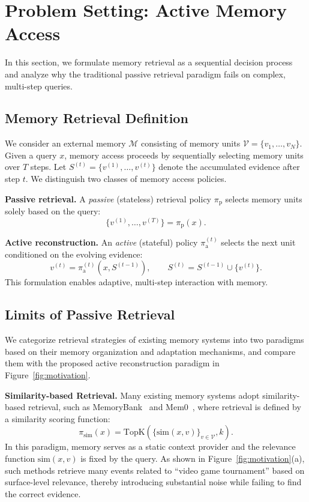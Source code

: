 \section{Problem Setting: Active Memory Access}
\label{sec:problem-setting}

In this section, we formulate memory retrieval as a sequential decision process and analyze why the traditional passive retrieval paradigm fails on complex, multi-step queries.

\subsection{Memory Retrieval Definition}

We consider an external memory $\mathcal{M}$ consisting of memory units
$\mathcal{V}=\{v_1,\dots,v_N\}$.
Given a query $x$, memory access proceeds by sequentially selecting memory
units over $T$ steps. Let
\(
S^{(t)} = \{v^{(1)}, \ldots, v^{(t)}\}
\)
denote the accumulated evidence after step $t$. We distinguish two classes of memory access policies.

\textbf{Passive retrieval.}
A \emph{passive} (stateless) retrieval policy $\pi_{\mathrm{p}}$ selects memory units solely based on the query:
\begin{equation}
\{v^{(1)}, \ldots, v^{(T)}\} = \pi_{\mathrm{p}}(x).
\end{equation}

\textbf{Active reconstruction.}
An \emph{active} (stateful) policy $\pi_{\mathrm{a}}^{(t)}$ selects the next unit conditioned on the evolving evidence:
\begin{equation}
v^{(t)} = \pi_{\mathrm{a}}^{(t)}(x, S^{(t-1)}),
\qquad S^{(t)} = S^{(t-1)} \cup \{v^{(t)}\}.
\end{equation}
This formulation enables adaptive, multi-step interaction with memory.

\subsection{Limits of Passive Retrieval}
\label{subsec:retrieval-failure}
We categorize retrieval strategies of existing memory systems into two paradigms based on their memory organization and adaptation mechanisms, and compare them with the proposed active reconstruction paradigm in Figure~\ref{fig:motivation}.

\textbf{Similarity-based Retrieval.}
Many existing memory systems adopt similarity-based retrieval, such as MemoryBank~\cite{DBLP:conf/aaai/ZhongGGYW24} and Mem0~\cite{DBLP:journals/corr/abs-2504-19413},
where retrieval is defined by a similarity scoring function:
\begin{equation}
\label{eq:pi-sim}
\pi_{\text{sim}}(x)
=
\mathrm{TopK}\!\left(\{ \mathrm{sim}(x,v) \}_{v \in \mathcal{V}}, k \right).
\end{equation}
In this paradigm, memory serves as a static context provider and the relevance function $\mathrm{sim}(x, v)$ is fixed by the query.
As shown in Figure~\ref{fig:motivation}(a), such methods retrieve many events related to ``video game tournament'' based on surface-level relevance, thereby introducing substantial noise while failing to find the correct evidence.

